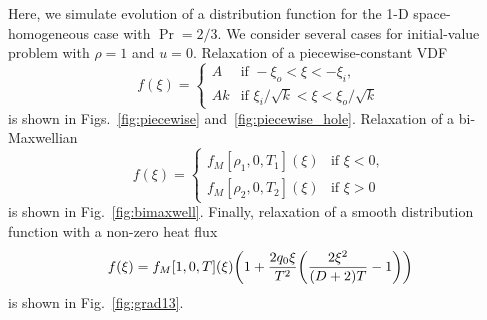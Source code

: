 \documentclass{article}
\begin{document}
Here, we simulate evolution of a distribution function for the 1-D space-homogeneous case with $\Pr = 2/3$.
We consider several cases for initial-value problem with $\rho=1$ and $u=0$.
Relaxation of a piecewise-constant VDF
\begin{equation}\label{eq:piecewise}
    f(\xi) = \begin{cases}
        A &\text{if } -\xi_o < \xi < -\xi_i, \\
        Ak &\text{if } \xi_i/\sqrt{k} < \xi < \xi_o/\sqrt{k}
    \end{cases}
\end{equation}
is shown in Figs.~\ref{fig:piecewise} and~\ref{fig:piecewise_hole}.
Relaxation of a bi-Maxwellian
\begin{equation}\label{eq:bimaxwell}
    f(\xi) = \begin{cases}
        f_M[\rho_1, 0, T_1](\xi) &\text{if } \xi < 0, \\
        f_M[\rho_2, 0, T_2](\xi) &\text{if } \xi > 0
    \end{cases}
\end{equation}
is shown in Fig.~\ref{fig:bimaxwell}.
Finally, relaxation of a smooth distribution function with a non-zero heat flux
\begin{equation}\label{eq:grad13}
    f(\xi) = f_M[1, 0, T](\xi)\qty(1 + \frac{2q_0\xi}{T^2}\qty(\frac{2\xi^2}{(D+2)T} - 1))
\end{equation}
is shown in Fig.~\ref{fig:grad13}.


\printbibliography
\end{document}
